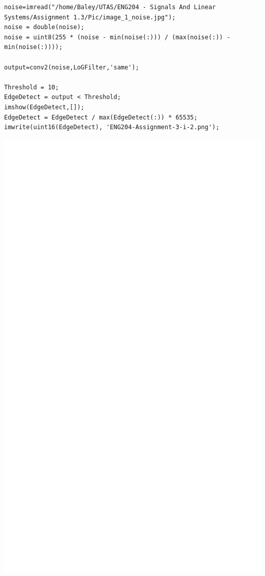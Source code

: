 \documentclass[11pt]{article}
\begin{document}
\begin{verbatim}
noise=imread("/home/Baley/UTAS/ENG204 - Signals And Linear Systems/Assignment 1.3/Pic/image_1_noise.jpg");
noise = double(noise);
noise = uint8(255 * (noise - min(noise(:))) / (max(noise(:)) - min(noise(:))));

output=conv2(noise,LoGFilter,'same');

Threshold = 10;
EdgeDetect = output < Threshold;
imshow(EdgeDetect,[]);
EdgeDetect = EdgeDetect / max(EdgeDetect(:)) * 65535;
imwrite(uint16(EdgeDetect), 'ENG204-Assignment-3-i-2.png');
\end{verbatim}

\begin{center}
\includegraphics[width=.9\linewidth]{ENG204-Assignment-3-i-2.png}
\end{center}
\end{document}

